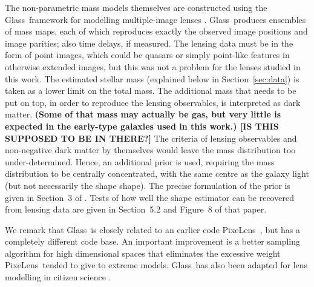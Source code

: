 \documentclass[useAMS,usenatbib]{mn2e}
\def\Glass{{\sc Glass}}
\def\PixeLens{{\sc PixeLens}}
\begin{document}
The non-parametric mass models themselves are constructed using the \Glass\ framework for modelling multiple-image lenses \citep{2014MNRAS.445.2181C}. \Glass\ produces ensembles of mass maps, each of which reproduces exactly the observed image positions and image parities; also time delays, if measured. The lensing data must be in the form of point images, which could be quasars or simply point-like features in otherwise extended images, but this was not a problem for the lenses studied in this work. The estimated stellar mass (explained below in Section~\ref{sec:data}) is taken as a lower limit on the total mass. The additional mass that needs to be put on top, in order to reproduce the lensing observables, is interpreted as dark matter. \textbf{(Some of that mass may actually be gas, but very little is expected in the early-type galaxies used in this work.) [IS THIS SUPPOSED TO BE IN THERE?]} The criteria of lensing observables and non-negative dark matter by themselves would leave the mass distribution too under-determined. Hence, an additional prior is used, requiring the mass distribution to be centrally concentrated, with the same centre as the galaxy light (but not necessarily the shape shape). The precise formulation of the prior is given in Section~3 of \citet{2014MNRAS.445.2181C}. Tests of how well the shape estimator can be recovered from lensing data are given in Section~5.2 and Figure~8 of that paper.

We remark that \Glass\ is closely related to an earlier code \PixeLens\ \citep{2004AJ....127.2604S,2008ApJ...679...17C}, but has a completely different code base. An important improvement is a better sampling algorithm for high dimensional spaces \citep{2012MNRAS.425.3077L} that eliminates the excessive weight \PixeLens\ tended to give to extreme models. \Glass\ has also been adapted for lens modelling in citizen science \citep{2015MNRAS.447.2170K}.
\end{document}
